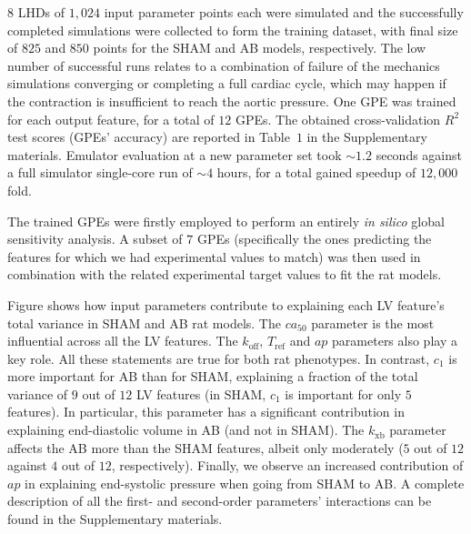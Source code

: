 \vspace{0.2cm}
$8$ LHDs of $1,024$ input parameter points each were simulated and the successfully completed simulations were collected to form the training dataset, with final size of $825$ and $850$ points for the SHAM and AB models, respectively. The low number of successful runs relates to a combination of failure of the mechanics simulations converging or completing a full cardiac cycle, which may happen if the contraction is insufficient to reach the aortic pressure. One GPE was trained for each output feature, for a total of $12$ GPEs. The obtained cross-validation $R^2$ test scores (GPEs' accuracy) are reported in Table~$1$ in the Supplementary materials. Emulator evaluation at a new parameter set took $\sim 1.2$ seconds against a full simulator single-core run of $\sim 4$ hours, for a total gained speedup of $12,000$ fold.

\vspace{0.2cm}
The trained GPEs were firstly employed to perform an entirely \textit{in silico} global sensitivity analysis. A subset of $7$ GPEs (specifically the ones predicting the features for which we had experimental values to match) was then used in combination with the related experimental target values to fit the rat models.

\vspace{0.2cm}
Figure shows how input parameters contribute to explaining each LV feature's total variance in SHAM and AB rat models. The $ca_{50}$ parameter is the most influential across all the LV features. The $k_{\textrm{off}}$, $T_{\textrm{ref}}$ and $ap$ parameters also play a key role. All these statements are true for both rat phenotypes. In contrast, $c_1$ is more important for AB than for SHAM, explaining a fraction of the total variance of $9$ out of $12$ LV features (in SHAM, $c_1$ is important for only $5$ features). In particular, this parameter has a significant contribution in explaining end-diastolic volume in AB (and not in SHAM). The $k_{\textrm{xb}}$ parameter affects the AB more than the SHAM features, albeit only moderately ($5$ out of $12$ against $4$ out of $12$, respectively). Finally, we observe an increased contribution of $ap$ in explaining end-systolic pressure when going from SHAM to AB. A complete description of all the first- and second-order parameters' interactions can be found in the Supplementary materials.


%
%
%
